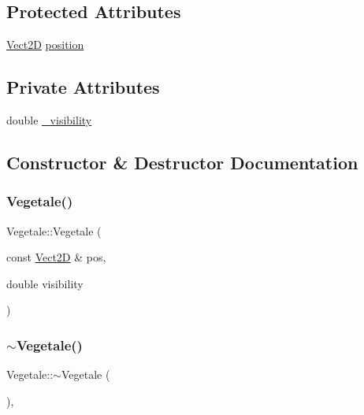 \subsection*{Protected Attributes}
\begin{DoxyCompactItemize}
\item 
\hyperlink{classVect2D}{Vect2D} \hyperlink{classCartesianObject2D_ae02ec6ed11f9bfc0c748da033d6a32f9_ae02ec6ed11f9bfc0c748da033d6a32f9}{position}
\end{DoxyCompactItemize}
\subsection*{Private Attributes}
\begin{DoxyCompactItemize}
\item 
double \hyperlink{classVegetale_afeead5953c496ba59f5f9201bc29c86f_afeead5953c496ba59f5f9201bc29c86f}{\+\_\+visibility}
\end{DoxyCompactItemize}


\subsection{Constructor \& Destructor Documentation}
\mbox{\label{classVegetale_ac3e8834cbccca2daa020e8df67ba70a4_ac3e8834cbccca2daa020e8df67ba70a4}} 
\subsubsection{\texorpdfstring{Vegetale()}{Vegetale()}}
{\footnotesize\ttfamily Vegetale\+::\+Vegetale (\begin{DoxyParamCaption}\item[{const \hyperlink{classVect2D}{Vect2D} \&}]{pos,  }\item[{double}]{visibility }\end{DoxyParamCaption})}

\mbox{\label{classVegetale_a6b793a68f74a30eef795b1c5458140a0_a6b793a68f74a30eef795b1c5458140a0}} 
\subsubsection{\texorpdfstring{$\sim$\+Vegetale()}{~Vegetale()}}
{\footnotesize\ttfamily Vegetale\+::$\sim$\+Vegetale (\begin{DoxyParamCaption}{ }\end{DoxyParamCaption})\hspace{0.3cm}{\ttfamily [virtual]}, {\ttfamily [default]}}



